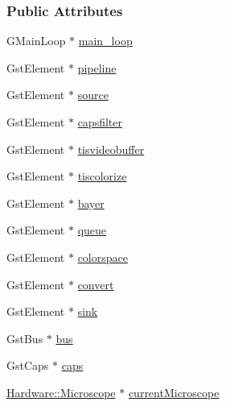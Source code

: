 \subsubsection*{Public Attributes}
\begin{DoxyCompactItemize}
\item 
G\+Main\+Loop $\ast$ \hyperlink{struct_hardware_1_1_microscope_1_1___custom_data_ae91d22ab690eff7f086d4fc6fdda7e50}{main\+\_\+loop}
\item 
Gst\+Element $\ast$ \hyperlink{struct_hardware_1_1_microscope_1_1___custom_data_aaf39f1862740897f67661ac21e22cc5d}{pipeline}
\item 
Gst\+Element $\ast$ \hyperlink{struct_hardware_1_1_microscope_1_1___custom_data_a2bc62de54f6ee34ef2fda4f8b1f17808}{source}
\item 
Gst\+Element $\ast$ \hyperlink{struct_hardware_1_1_microscope_1_1___custom_data_ae1032439e4a4cffefd06929d5aa8d283}{capsfilter}
\item 
Gst\+Element $\ast$ \hyperlink{struct_hardware_1_1_microscope_1_1___custom_data_a22c00ed28d0ebc1418b096f36d8f2d50}{tisvideobuffer}
\item 
Gst\+Element $\ast$ \hyperlink{struct_hardware_1_1_microscope_1_1___custom_data_aead275427306139fd257703992709499}{tiscolorize}
\item 
Gst\+Element $\ast$ \hyperlink{struct_hardware_1_1_microscope_1_1___custom_data_af7aa9d3b405cad2f564537954c3b70e7}{bayer}
\item 
Gst\+Element $\ast$ \hyperlink{struct_hardware_1_1_microscope_1_1___custom_data_a035f8650ed7e1d28459fbbb8f680a4bf}{queue}
\item 
Gst\+Element $\ast$ \hyperlink{struct_hardware_1_1_microscope_1_1___custom_data_ab745c37a5d761e71a8b60581d23284ec}{colorspace}
\item 
Gst\+Element $\ast$ \hyperlink{struct_hardware_1_1_microscope_1_1___custom_data_a6f1ebafe6122de462774fbe2d3d3e3bd}{convert}
\item 
Gst\+Element $\ast$ \hyperlink{struct_hardware_1_1_microscope_1_1___custom_data_afc35bf0fc822422a2b979fdfca74b14c}{sink}
\item 
Gst\+Bus $\ast$ \hyperlink{struct_hardware_1_1_microscope_1_1___custom_data_a92300301898e4dbcedf3d74ca3db3825}{bus}
\item 
Gst\+Caps $\ast$ \hyperlink{struct_hardware_1_1_microscope_1_1___custom_data_ad068f72fc8487744c2e5e71e9096abf1}{caps}
\item 
\hyperlink{class_hardware_1_1_microscope}{Hardware\+::\+Microscope} $\ast$ \hyperlink{struct_hardware_1_1_microscope_1_1___custom_data_a8356f8298aaff0788bac41d1746eaaba}{current\+Microscope}
\end{DoxyCompactItemize}


